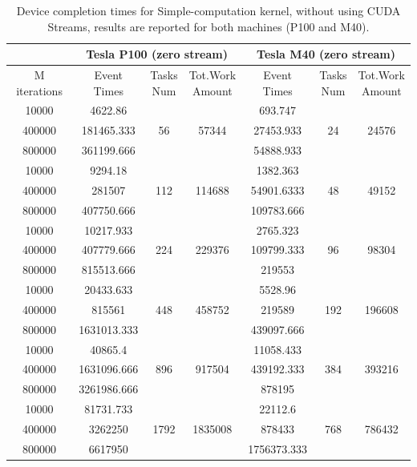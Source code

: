 \begin{table}	
	\centering
	\begin{tabular}{ | c ||  c | c  c  || c | c  c | } 
		\hline
		&  \multicolumn{3}{c||}{\textbf{Tesla P100 (zero stream)}} & \multicolumn{3}{c|}{\textbf{Tesla M40 (zero stream)}}\\ [0.5ex]
		\hline
		M iterations & Event Times & \makecell{Tasks \\ Num} & \makecell{Tot.Work \\ Amount}    &    Event Times & \makecell{Tasks \\ Num} & \makecell{Tot.Work \\ Amount}  \\
		\hline\hline
		
		
		10000 &	4622.86 & \multirow{3}{*}{56} &	\multirow{3}{*}{57344}&	693.747 & \multirow{3}{*}{24} &	\multirow{3}{*}{24576}\\
		400000 & 181465.333 &  &	&	27453.933& &	\\
		800000 &	361199.666&	& &	54888.933 &  &	\\
		\hline
		10000 &	9294.18 & \multirow{3}{*}{112}&	\multirow{3}{*}{114688}&	1382.363&\multirow{3}{*}{48}&	\multirow{3}{*}{49152}\\
		400000 &	281507 &	& &	54901.6333& &	\\
		800000 &	407750.666&	& &	109783.666&	&\\
		\hline
		10000 &	10217.933&\multirow{3}{*}{224}&	\multirow{3}{*}{229376}&	2765.323& \multirow{3}{*}{96}&	\multirow{3}{*}{98304}\\
		400000 &	407779.666&	& &	109799.333& &\\
		800000 &	815513.666&	& &	219553& &	\\
		\hline
		10000 &	20433.633&\multirow{3}{*}{448}&	\multirow{3}{*}{458752}&	5528.96&\multirow{3}{*}{192}&	\multirow{3}{*}{196608}\\
		400000 &	815561&	& &	219589& &	\\
		800000 &	1631013.333& &	&	439097.666& &	\\
		\hline
		10000 &	40865.4&\multirow{3}{*}{896}&	\multirow{3}{*}{917504}&	11058.433&\multirow{3}{*}{384}&	\multirow{3}{*}{393216}\\
		400000 &	1631096.666& &	&	439192.333& &	\\
		800000 &	3261986.666& &	&	878195& &	\\
		\hline
		10000 &	81731.733& \multirow{3}{*}{1792}&\multirow{3}{*}{1835008}&	22112.6&\multirow{3}{*}{768}&	\multirow{3}{*}{786432}\\
		400000 &	3262250	& & &	878433& &	\\
		800000 &	6617950 & &	&	1756373.333& &	\\
		\hline
	\end{tabular}
	\caption{Device completion times for Simple-computation kernel, without using CUDA Streams, results are reported for both machines (P100 and M40).}	
	\label{tab:cosavgszero}		
\end{table}

